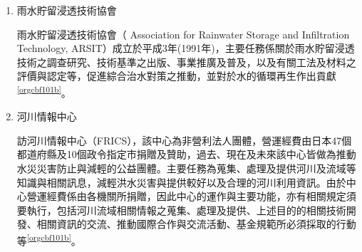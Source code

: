 \documentclass[a4paper,12pt]{article}
\begin{document}
\begin{enumerate}
\begin{enumerate}
東京都隨都市化進展，降雨逕流大增，水害頻繁威脅住民生命財產安全，遂推展「中小河川流域治水計畫」，重新建立下水道的排水標準，將設計標準從 3 年頻率降雨強度 50.0mm/hr，提昇至 15 年頻率降雨強度75.0mm/hr 以上。除了提高老舊的下水道（排水路）、抽水站的排水標準外，也加入蓄洪、入滲、貯留、系統預測、土地管制檢討等減洪思維，新建地下調節池及雨水貯留管。地下調節池可疏導調節 25％之洪水量。\\

在建立地下調節池及雨水貯留管的初期，日本政府曾被質疑為何不直接浚深河川，透過增加通水斷面減少水患。浚深河川的難處在於，日本都市化發展飽和，許多河川水道之下已佈滿地鐵、自來水、瓦斯等設施管線，因此改以建立地下調節池及雨水貯留管來提昇排水標準。未來台北市也可能面臨類似問題，加上潮汐迴水的問題，可將地下調節池及雨水貯留管列為長期的規劃目標。惟興建此類設施的人力、時間、經費成本都極為巨大，政府應讓公民更加深入了解此議題，促進未來的政策透明及規劃方向\footnote{\href{https://pansci.asia/archives/75374}{若大禹再世（一）：治水策略 學日荷，好不好？}\\}。\\

\item 雨水貯留浸透技術協會
\label{sec:orgf87ffc7}

雨水貯留浸透技術協會（ Association for Rainwater Storage and Infiltration Technology, ARSIT）成立於平成3年(1991年)，主要任務係關於雨水貯留浸透技術之調查研究、技術基準之出版、事業推廣及普及，以及有關工法及材料之評價與認定等，促進綜合治水對策之推動，並對於水的循環再生作出貢獻\textsuperscript{\ref{orgcbf101b}}。\\

\item 河川情報中心
\label{sec:org633a0f4}

訪河川情報中心（FRICS），該中心為非營利法人團體，營運經費由日本47個都道府縣及10個政令指定市捐贈及贊助，過去、現在及未來該中心皆做為推動水災災害防止與減輕的公益團體。主要任務為蒐集、處理及提供河川及流域等知識與相關訊息，減輕洪水災害與提供較好以及合理的河川利用資訊。由於中心營運經費係由各機關所捐贈，因此中心的運作與主要功能，亦有相關規定須要執行，包括河川流域相關情報之蒐集、處理及提供、上述目的的相關技術開發、相關資訊的交流、推動國際合作與交流活動、基金規範所必須採取的行動等\textsuperscript{\ref{orgcbf101b}}。\\


\end{enumerate}
\end{enumerate}
\end{document}
